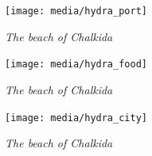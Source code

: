 \documentclass[10pt,a4paper]{article} %
\begin{document}
\begin{multicols}{3}
\begin{center}
	\texttt{[image: media/hydra\_port]}
	\par\textit{The beach of Chalkida}
\end{center}


\begin{center}
	\texttt{[image: media/hydra\_food]}
	\par\textit{The beach of Chalkida}
\end{center}

\begin{center}
	\texttt{[image: media/hydra\_city]}
	\par\textit{The beach of Chalkida}
\end{center}


\end{multicols}

\end{document}
